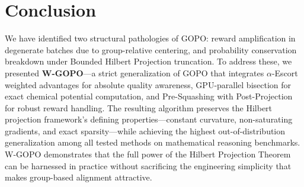 \documentclass[11pt]{article}
\theoremstyle{definition}
\theoremstyle{remark}
\begin{document}
\section{Conclusion}
\label{sec:conclusion}

We have identified two structural pathologies of GOPO: reward amplification in degenerate batches due to group-relative centering, and probability conservation breakdown under Bounded Hilbert Projection truncation. To address these, we presented \textbf{W-GOPO}---a strict generalization of GOPO that integrates $\alpha$-Escort weighted advantages for absolute quality awareness, GPU-parallel bisection for exact chemical potential computation, and Pre-Squashing with Post-Projection for robust reward handling. The resulting algorithm preserves the Hilbert projection framework's defining properties---constant curvature, non-saturating gradients, and exact sparsity---while achieving the highest out-of-distribution generalization among all tested methods on mathematical reasoning benchmarks. W-GOPO demonstrates that the full power of the Hilbert Projection Theorem can be harnessed in practice without sacrificing the engineering simplicity that makes group-based alignment attractive.
\end{document}
